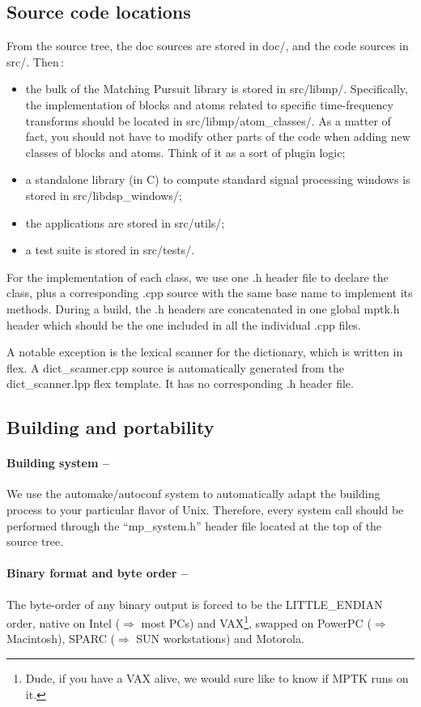 \documentclass[11pt,a4paper]{article}
\begin{document}
\subsection{Source code locations}
From the source tree, the doc sources are stored in doc/, and the code sources
in src/. Then\,:
\begin{itemize}
\item the bulk of the Matching Pursuit library is stored in src/libmp/.
  Specifically, the implementation of blocks and atoms related to specific
  time-frequency transforms should be located in src/libmp/atom\_classes/. As a
  matter of fact, you should not have to modify other parts of the code when
  adding new classes of blocks and atoms. Think of it as a sort of plugin
  logic;
\item a standalone library (in C) to compute standard signal processing windows
  is stored in src/libdsp\_windows/;
\item the applications are stored in src/utils/;
\item a test suite is stored in src/tests/.
\end{itemize}
For the implementation of each class, we use one .h header file to declare the
class, plus a corresponding .cpp source with the same base name to implement
its methods. During a build, the .h headers are concatenated in one global
mptk.h header which should be the one included in all the individual .cpp
files.

A notable exception is the lexical scanner for the dictionary, which is written
in flex. A dict\_scanner.cpp source is automatically generated from the
dict\_scanner.lpp flex template. It has no corresponding .h header file.


\pagebreak
\subsection{Building and portability}

\paragraph{Building system --} We use the automake/autoconf system
to automatically adapt the building process to your particular flavor of Unix.
Therefore, every system call should be performed through the ``mp\_system.h''
header file located at the top of the source tree.

\paragraph{Binary format and byte order --} The byte-order of any binary output
is forced to be the LITTLE\_ENDIAN order, native on Intel ($\Rightarrow$ most
PCs) and VAX\footnote{Dude, if you have a VAX alive, we would sure like to know
  if MPTK runs on it.}, swapped on PowerPC ($\Rightarrow$ Macintosh), SPARC
($\Rightarrow$ SUN workstations) and Motorola.
\end{document}
